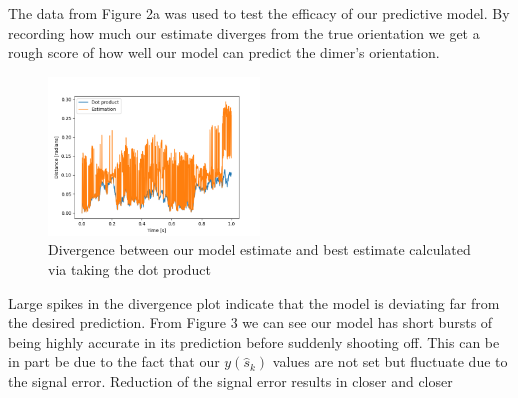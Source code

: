 \documentclass[11pt]{article}
\begin{document}
The data from Figure 2a was used to test the efficacy of our predictive model. By recording how much our estimate diverges from the true orientation we get a rough score of how well our model can predict the dimer's orientation. 

\begin{figure}[h]
	\centering
	\includegraphics[width=0.5\textwidth]{Divergance.png}
	\caption{Divergence between our model estimate and best estimate calculated via taking the dot product}
\end{figure}

Large spikes in the divergence plot indicate that the model is deviating far from the desired prediction. From Figure 3 we can see our model has short bursts of being highly accurate in its prediction before suddenly shooting off. This can be in part be due to the fact that our $y(\hat{s}_k)$ values are not set but fluctuate due to the signal error. Reduction of the signal error results in closer and closer 



\end{document}
